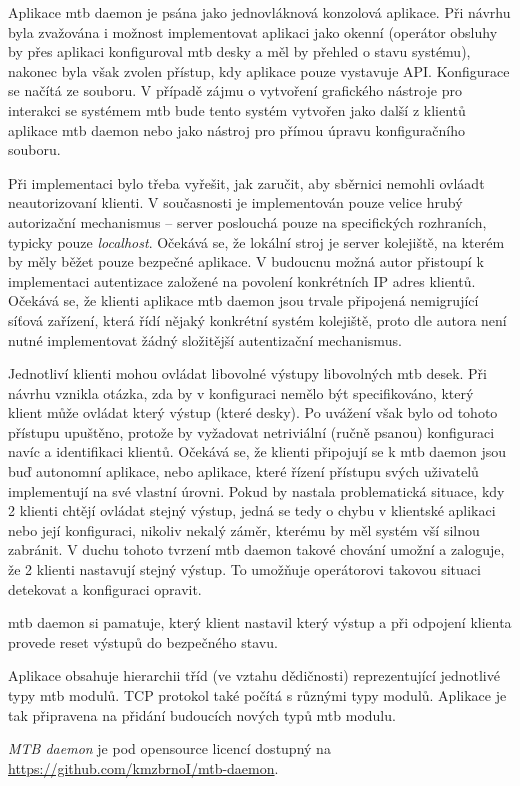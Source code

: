 Aplikace \gls{mtb} daemon je psána jako jednovláknová konzolová aplikace.
Při návrhu byla zvažována i možnost implementovat aplikaci jako okenní
(operátor obsluhy by přes aplikaci konfiguroval \gls{mtb} desky a měl by
přehled o stavu systému), nakonec byla však zvolen přístup, kdy aplikace pouze
vystavuje API. Konfigurace se načítá ze souboru. V případě zájmu o vytvoření
grafického nástroje pro interakci se systémem \gls{mtb} bude tento systém
vytvořen jako další z klientů aplikace \gls{mtb} daemon nebo jako nástroj pro
přímou úpravu konfiguračního souboru.

Při implementaci bylo třeba vyřešit, jak zaručit, aby sběrnici nemohli ovláadt
neautorizovaní klienti. V současnosti je implementován pouze velice hrubý
autorizační mechanismus – server poslouchá pouze na specifických rozhraních,
typicky pouze \textit{localhost}. Očekává se, že lokální stroj je server
kolejiště, na kterém by měly běžet pouze bezpečné aplikace. V budoucnu možná
autor přistoupí k implementaci autentizace založené na povolení konkrétních
IP adres klientů. Očekává se, že klienti aplikace \gls{mtb} daemon jsou trvale
připojená nemigrující síťová zařízení, která řídí nějaký konkrétní systém
kolejiště, proto dle autora není nutné implementovat žádný složitější
autentizační mechanismus.

Jednotliví klienti mohou ovládat libovolné výstupy libovolných \gls{mtb} desek.
Při návrhu vznikla otázka, zda by v konfiguraci nemělo být specifikováno,
který klient může ovládat který výstup (které desky). Po uvážení však bylo od
tohoto přístupu upuštěno, protože by vyžadovat netriviální (ručně psanou)
konfiguraci navíc a identifikaci klientů. Očekává se, že klienti připojují
se k \gls{mtb} daemon jsou buď autonomní aplikace, nebo aplikace, které řízení
přístupu svých uživatelů implementují na své vlastní úrovni. Pokud by nastala
problematická situace, kdy 2 klienti chtějí ovládat stejný výstup, jedná se
tedy o chybu v klientské aplikaci nebo její konfiguraci, nikoliv nekalý záměr,
kterému by měl systém vší silnou zabránit. V duchu tohoto tvrzení \gls{mtb} daemon
takové chování umožní a zaloguje, že 2 klienti nastavují stejný výstup. To
umožňuje operátorovi takovou situaci detekovat a konfiguraci opravit.

\gls{mtb} daemon si pamatuje, který klient nastavil který výstup a při odpojení
klienta provede reset výstupů do bezpečného stavu.

Aplikace obsahuje hierarchii tříd (ve vztahu dědičnosti) reprezentující
jednotlivé typy \gls{mtb} modulů. TCP protokol také počítá s různými typy
modulů. Aplikace je tak připravena na přidání budoucích nových typů \gls{mtb}
modulu.

\textit{MTB daemon} je pod opensource licencí dostupný na
\url{https://github.com/kmzbrnoI/mtb-daemon}.
